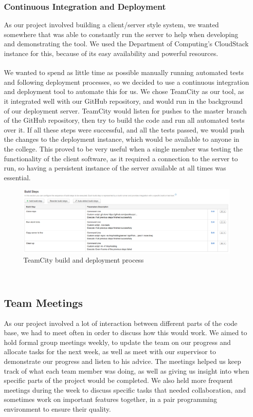 \documentclass{article}
\begin{document}
\subsubsection{Continuous Integration and Deployment}
As our project involved building a client/server style system, we wanted somewhere that was able to constantly run the server to help when developing and demonstrating the tool. We used the Department of Computing's CloudStack instance for this, because of its easy availability and powerful resources. 
\\\\
We wanted to spend as little time as possible manually running automated tests and following deployment processes, so we decided to use a continuous integration and deployment tool to automate this for us. We chose TeamCity as our tool, as it integrated well with our GitHub repository, and would run in the background of our deployment server. TeamCity would listen for pushes to the master branch of the GitHub repository, then try to build the code and run all automated tests over it. If all these steps were successful, and all the tests passed, we would push the changes to the deployment instance, which would be available to anyone in the college. This proved to be very useful when a single member was testing the functionality of the client software, as it required a connection to the server to run, so having a persistent instance of the server available at all times was essential. 
\begin{figure}[h]
  \centering
  \includegraphics[scale=0.35]{buildserver}
  \caption{TeamCity build and deployment process}
  \label{fig:buildserver}
\end{figure}
\\ 
\subsection{Team Meetings}
As our project involved a lot of interaction between different parts of the code base, we had to meet often in order to discuss how this would work. We aimed to hold formal group meetings weekly, to update the team on our progress and allocate tasks for the next week, as well as meet with our supervisor to demonstrate our progress and listen to his advice. The meetings helped us keep track of what each team member was doing, as well as giving us insight into when specific parts of the project would be completed. We also held more frequent meetings during the week to discuss specific tasks that needed collaboration, and sometimes work on important features together, in a pair programming environment to ensure their quality. 
\end{document}
